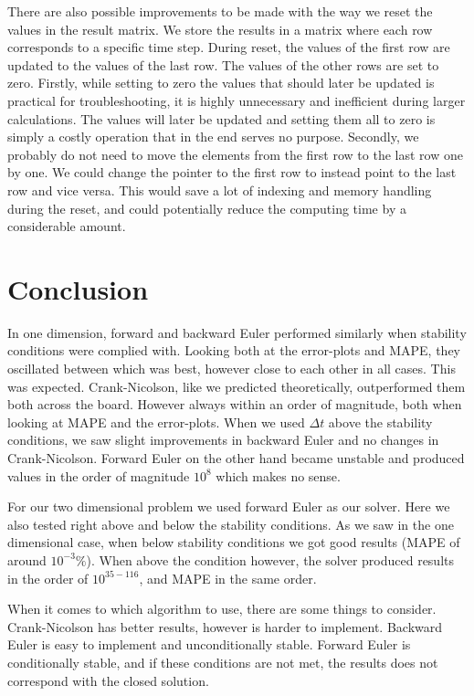 \documentclass[reprint, english,notitlepage,nofootinbib]{revtex4-1}  %
\begin{document}
There are also possible improvements to be made with the way we reset the values in the result matrix. We store the results in a matrix where each row corresponds to a specific time step. During reset, the values of the first row are updated to the values of the last row. The values of the other rows are set to zero. Firstly, while setting to zero the values that should later be updated is practical for troubleshooting, it is highly unnecessary and inefficient during larger calculations. The values will later be updated and setting them all to zero is simply a costly operation that in the end serves no purpose. Secondly, we probably do not need to move the elements from the first row to the last row one by one. We could change the pointer to the first row to instead point to the last row and vice versa. This would save a lot of indexing and memory handling during the reset, and could potentially reduce the computing time by a considerable amount.



\section{Conclusion}

In one dimension, forward and backward Euler performed similarly when stability conditions were complied with. Looking both at the error-plots and MAPE, they oscillated between which was best, however close to each other in all cases. This was expected. Crank-Nicolson, like we predicted theoretically, outperformed them both across the board. However always within an order of magnitude, both when looking at MAPE and the error-plots. When we used $\Delta t$ above the stability conditions, we saw slight improvements in backward Euler and no changes in Crank-Nicolson. Forward Euler on the other hand became unstable and produced values in the order of magnitude $10^8$ which makes no sense.

For our two dimensional problem we used forward Euler as our solver. Here we also tested right above and below the stability conditions. As we saw in the one dimensional case, when below stability conditions we got good results (MAPE of around $10^{-3}\%$). When above the condition however, the solver produced results in the order of $10^{35-116}$, and MAPE in the same order.

When it comes to which algorithm to use, there are some things to consider. Crank-Nicolson has better results, however is harder to implement. Backward Euler is easy to implement and unconditionally stable. Forward Euler is conditionally stable, and if these conditions are not met, the results does not correspond with the closed solution.
\end{document}
